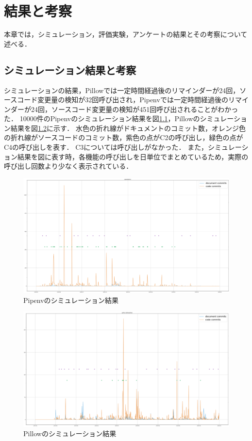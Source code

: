 \chapter{結果と考察}
本章では，シミュレーション，評価実験，アンケートの結果とその考察について述べる．

\section{シミュレーション結果と考察}
シミュレーションの結果，Pillowでは一定時間経過後のリマインダーが24回，ソースコード変更量の検知が32回呼び出され，Pipenvでは一定時間経過後のリマインダーが24回，ソースコード変更量の検知が451回呼び出されることがわかった．
10000件のPipenvのシミュレーション結果を図\ref{sim1}，Pillowのシミュレーション結果を図\ref{sim2}に示す．
水色の折れ線がドキュメントのコミット数，オレンジ色の折れ線がソースコードのコミット数，紫色の点がC2の呼び出し，緑色の点がC4の呼び出しを表す．
C3については呼び出しがなかった．
また，シミュレーション結果を図に表す時，各機能の呼び出しを日単位でまとめているため，実際の呼び出し回数より少なく表示されている．

\begin{figure}[H]
    \centering
    \includegraphics[width=14cm]{images/sim1.png}
    \caption{Pipenvのシミュレーション結果}
    \label{sim1}
\end{figure}

\begin{figure}[H]
    \centering
    \includegraphics[width=14cm]{images/sim2.png}
    \caption{Pillowのシミュレーション結果}
    \label{sim2}
\end{figure}

